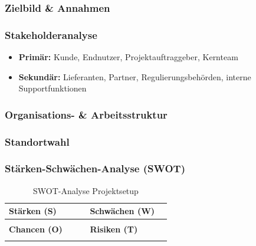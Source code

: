 \documentclass[
%
ngerman %
%
numeric %
]{wbh-assignment}
\begin{document}
\vspace*{5mm}

\subsubsection{Zielbild \& Annahmen}

\subsubsection{Stakeholderanalyse}
\begin{itemize}
  \item \textbf{Primär:} Kunde, Endnutzer, Projektauftraggeber, Kernteam
  \item \textbf{Sekundär:} Lieferanten, Partner, Regulierungsbehörden, interne Supportfunktionen
\end{itemize}

\subsubsection{Organisations- \& Arbeitsstruktur}

\subsubsection{Standortwahl}

\subsubsection{Stärken-Schwächen-Analyse (SWOT)}
\begin{table}[htb!]
\centering
\caption{SWOT-Analyse Projektsetup}
\begin{tabular}{p{0.45\linewidth} p{0.45\linewidth}}
\textbf{Stärken (S)} & \textbf{Schwächen (W)} \\
\hline
& \\
\textbf{Chancen (O)} & \textbf{Risiken (T)} \\
\hline
& \\
\end{tabular}
\end{table}
\end{document}

